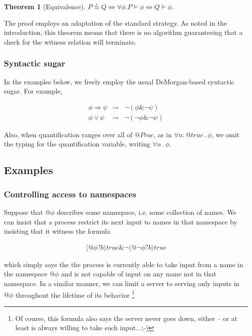 \documentclass[]{amsart}
\makeatletter
\newcommand{\quotep}[1]{@#1}
\newcommand{\QProc}{\quotep{\mathbin{Proc}}}
\newcommand{\defneqls}{\coloneqq}
\newcommand{\wbbisim}{\stackrel{\centerdot}{\approx}} %
\newcommand{\ptrue}{\mathbin{true}}
\newcommand{\pprefix}[3]{\langle #1 ? #2 \rangle #3}
\newcommand{\pquant}[3]{\forall #1 \mathbin{:} #2 \mathbin{.} #3}
\newcommand{\pquantuntyped}[2]{\forall #1 \mathbin{.} #2}
\newcommand{\riff}{\Leftrightarrow}
\newtheorem{thm}{Theorem}[subsection]
\theoremstyle{definition}
\theoremstyle{remark}
\numberwithin{equation}{subsection}
\makeatother
\begin{document}
\begin{thm}[Equivalence]
	$P \wbbisim Q \riff \forall \phi . P \models \phi \riff Q \models \phi .$
\end{thm}

The proof employs an adaptation of the standard strategy. As noted in
the introduction, this theorem means that there is no algorithm
guaranteeing that a check for the witness relation will terminate.

\subsubsection{Syntactic sugar }

In the examples below, we freely employ the usual DeMorgan-based
syntactic sugar. For example,

\begin{eqnarray}
	\phi \Rightarrow \psi & \defneqls & \neg ( \phi \& \neg \psi ) \nonumber\\
	\phi \vee \psi & \defneqls & \neg ( \neg \phi \& \neg \psi ) \nonumber
\end{eqnarray}

Also, when quantification ranges over all of $\QProc$, as in
$\pquant{n}{\quotep{\ptrue}}{\phi}$, we omit the typing for the
quantification variable, writing $\pquantuntyped{n}{\phi}$.

\subsection{Examples}

\subsubsection{Controlling access to namespaces}

Suppose that $\quotep{\phi}$ describes some namespace, i.e. some
collection of names. We can insist that a process restrict its next
input to names in that namespace by insisting that it witness the formula

\begin{eqnarray}
  \pprefix{\quotep{\phi}}{b}{\ptrue} \& \neg \pprefix{\quotep{\neg \phi}}{b}{\ptrue} \nonumber
\end{eqnarray}

which simply says the the process is currently able to take input from
a name in the namespace $\quotep{\phi}$ and is not capable of input on
any name not in that namespace. In a similar manner, we can limit a
server to serving only inputs in $\quotep{\phi}$ throughout the
lifetime of its behavior \footnote{Of course, this formula also says
  the server never goes down, either -- or at least is always willing
  to take such input...;-)}
\end{document}
